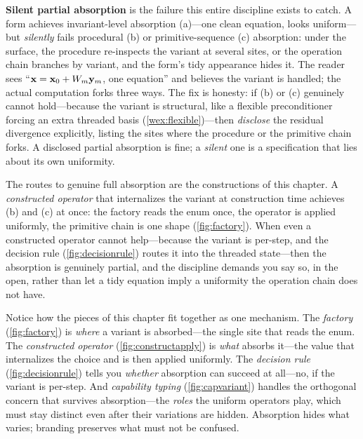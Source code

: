 \begin{pitfall}
\textbf{Silent partial absorption} is the failure this entire discipline exists to
catch. A form achieves invariant-level absorption (a)---one clean equation, looks
uniform---but \emph{silently} fails procedural (b) or primitive-sequence (c)
absorption: under the surface, the procedure re-inspects the variant at several sites,
or the operation chain branches by variant, and the form's tidy appearance hides it.
The reader sees ``$\mathbf{x} = \mathbf{x}_0 + W_m \mathbf{y}_m$, one equation'' and believes the variant
is handled; the actual computation forks three ways. The fix is honesty: if (b) or (c)
genuinely cannot hold---because the variant is structural, like a flexible
preconditioner forcing an extra threaded basis (\cref{wex:flexible})---then
\emph{disclose} the residual divergence explicitly, listing the sites where the
procedure or the primitive chain forks. A disclosed partial absorption is fine; a
\emph{silent} one is a specification that lies about its own uniformity.
\end{pitfall}

The routes to genuine full absorption are the constructions of this chapter. A
\emph{constructed operator} that internalizes the variant at construction time
achieves (b) and (c) at once: the factory reads the enum once, the operator is
applied uniformly, the primitive chain is one shape (\cref{fig:factory}). When even a
constructed operator cannot help---because the variant is per-step, and the decision
rule (\cref{fig:decisionrule}) routes it into the threaded state---then the absorption
is genuinely partial, and the discipline demands you say so, in the open, rather than
let a tidy equation imply a uniformity the operation chain does not have.

\begin{remark}
Notice how the pieces of this chapter fit together as one mechanism. The
\emph{factory} (\cref{fig:factory}) is \emph{where} a variant is absorbed---the single
site that reads the enum. The \emph{constructed operator} (\cref{fig:constructapply})
is \emph{what} absorbs it---the value that internalizes the choice and is then applied
uniformly. The \emph{decision rule} (\cref{fig:decisionrule}) tells you \emph{whether}
absorption can succeed at all---no, if the variant is per-step. And \emph{capability
typing} (\cref{fig:capvariant}) handles the orthogonal concern that survives
absorption---the \emph{roles} the uniform operators play, which must stay distinct even
after their variations are hidden. Absorption hides what varies; branding preserves
what must not be confused.
\end{remark}

